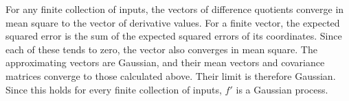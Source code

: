 \documentclass[11pt,letterpaper]{article}
\begin{document}

For any finite collection of inputs, the vectors of difference quotients
converge in mean square to the vector of derivative values.
For a finite vector, the expected squared error is the sum of the expected
squared errors of its coordinates.
Since each of these tends to zero,
the vector also converges in mean square.
The approximating vectors are Gaussian, and their mean vectors and
covariance matrices converge to those calculated above.
Their limit is
therefore Gaussian.
Since this holds for every finite collection of
inputs, $f'$ is a Gaussian process.
\end{document}
